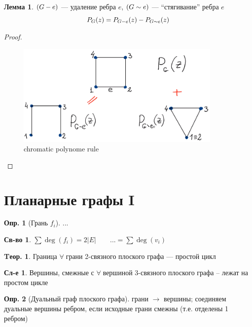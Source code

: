 \documentclass[a4paper,12pt]{article}
\theoremstyle{definition}
\newtheorem{definition}{Опр.}[section]
\newtheorem*{property}{Св-во}  %
\theoremstyle{definition}
\newtheorem{theorem}{Tеор.}[section]
\newtheorem*{corollary}{Сл-е} %
\newtheorem{lemma}{Лемма}[section]
\def\iiany{$\forall\;$}
\begin{document}
\begin{lemma} $(G - e)$ --- удаление ребра $e$,
	          $(G \sim e)$ --- ``стягивание'' ребра $e$
	\[ P_{G}(z) = P_{G - e}(z) - P_{G \sim e}(z) \]
\end{lemma}
\begin{proof}
	\hspace{1pt}
	\begin{figure}[H]
		\centering
		\includegraphics[width=10cm]{chromatic-polynome-rule.png}
		\caption{chromatic polynome rule}
	\end{figure}
	\hspace{1pt}
\end{proof}



\section{Планарные графы I}

\begin{definition}[Грань $f_i$] ...
\end{definition}

\begin{property}
	$ \sum{\deg(f_i)} = 2|E| \qquad ... = \sum{\deg(v_i)}$
\end{property}

\begin{theorem}
	Граница \iiany грани 2-связного плоского графа --- простой цикл
\end{theorem}

\begin{corollary}
	Вершины, смежные с \iiany вершиной 3-связного плоского графа -- лежат на простом цикле
\end{corollary}

\begin{definition}[Дуальный граф плоского графа]
	грани $\longrightarrow$ вершины; соединяем дуальные вершины ребром, если исходные грани смежны (т.е. отделены 1 ребром)
\end{definition}
\end{document}
